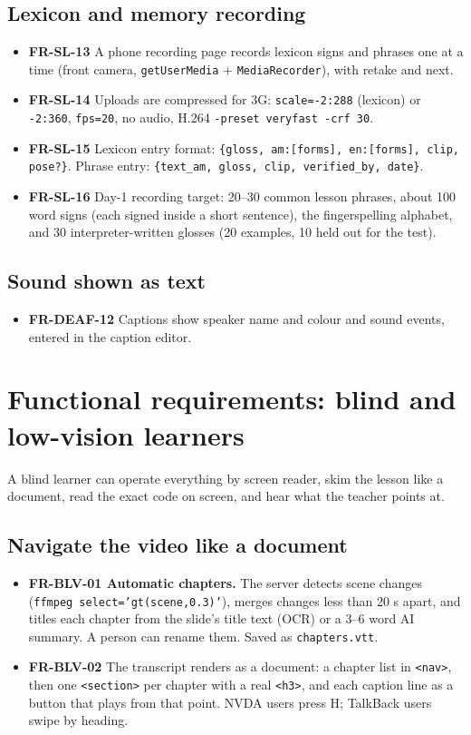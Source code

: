 \documentclass[11pt,a4paper]{article}
\newcommand{\code}[1]{\texttt{#1}}
\newcommand{\req}[1]{\textbf{#1}}
\begin{document}
\subsection{Lexicon and memory recording}
\begin{itemize}
  \item \req{FR-SL-13} A phone recording page records lexicon signs and phrases one at a time (front camera, \code{getUserMedia} + \code{MediaRecorder}), with retake and next.
  \item \req{FR-SL-14} Uploads are compressed for 3G: \code{scale=-2:288} (lexicon) or \code{-2:360}, \code{fps=20}, no audio, H.264 \code{-preset veryfast -crf 30}.
  \item \req{FR-SL-15} Lexicon entry format: \code{\{gloss, am:[forms], en:[forms], clip, pose?\}}. Phrase entry: \code{\{text\_am, gloss, clip, verified\_by, date\}}.
  \item \req{FR-SL-16} Day-1 recording target: 20--30 common lesson phrases, about 100 word signs (each signed inside a short sentence), the fingerspelling alphabet, and 30 interpreter-written glosses (20 examples, 10 held out for the test).
\end{itemize}

\subsection{Sound shown as text}
\begin{itemize}
  \item \req{FR-DEAF-12} Captions show speaker name and colour and sound events, entered in the caption editor.
\end{itemize}

\section{Functional requirements: blind and low-vision learners}

A blind learner can operate everything by screen reader, skim the lesson like a document, read the exact code on screen, and hear what the teacher points at.

\subsection{Navigate the video like a document}
\begin{itemize}
  \item \req{FR-BLV-01 Automatic chapters.} The server detects scene changes (\code{ffmpeg select='gt(scene,0.3)'}), merges changes less than 20 s apart, and titles each chapter from the slide's title text (OCR) or a 3--6 word AI summary. A person can rename them. Saved as \code{chapters.vtt}.
  \item \req{FR-BLV-02} The transcript renders as a document: a chapter list in \code{<nav>}, then one \code{<section>} per chapter with a real \code{<h3>}, and each caption line as a button that plays from that point. NVDA users press H; TalkBack users swipe by heading.
\end{itemize}
\end{document}
